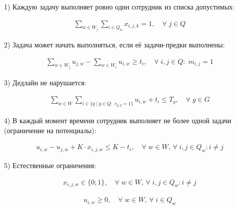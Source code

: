 \documentclass[14pt,fleqn]{extarticle}
\begin{document}
	1) Каждую задачу выполняет ровно один сотрудник из списка допустимых:
	
	\begin{ceqn}
		\begin{align*}
			\sum_{w \in W_j} \sum_{i \in Q_w} x_{i,j,k} = 1, \quad \forall \; j \in Q
		\end{align*}
	\end{ceqn}

	2) Задача может начать выполняться, если её задачи-предки выполнены:
	
	\begin{ceqn}
		\begin{align*}
			\sum_{w \in W_j} u_{j,w} - \sum_{w \in W_i} u_{i,w} \geq t_i, \quad \forall \; i, j \in Q: \; m_{i,j} = 1
		\end{align*}
	\end{ceqn}

	\newpage

	3) Дедлайн не нарушается:
	
	\begin{ceqn}
		\begin{align*}
			\sum_{w \in W} \sum_{i \in \{q \; | \; q \in Q: \; r_{g,q} = 1\}} u_{i, w} + t_i \leq T_g, \quad \forall \; g \in G
		\end{align*}
	\end{ceqn}

	4) В каждый момент времени сотрудник выполняет не более одной задачи (ограничение на потенциалы):

	\begin{ceqn}
		\begin{align*}
			u_{i,w} - u_{j,w} + K \cdot x_{i,j,w} \leq K - t_i, \quad \forall \; w \in W, \, \forall \; i, j \in Q_w: i \neq j
		\end{align*}
	\end{ceqn}

	5) Естественные ограничения:
	\begin{ceqn}
		\begin{align*}
			x_{i,j,w} \in \{0;1\}, \quad \forall \; w \in W, \, \forall \; i, j \in Q_w: i \neq j
		\end{align*}
	\end{ceqn}

	\begin{ceqn}
		\begin{align*}
			u_{i, w} \geq 0, \quad \forall \; w \in W, \, \forall \; i \in Q_w
		\end{align*}
	\end{ceqn}
\end{document}
